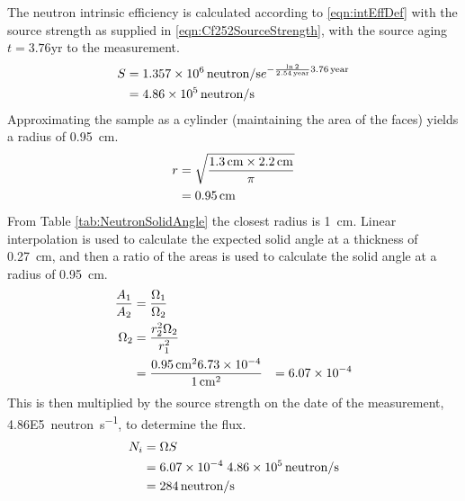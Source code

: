 \documentclass[draftcls,onecolumn]{IEEEtran}
\begin{document}
\begin{Exercise*}[label={PEN LiF with ADS},title={PEN LiF film with ADS},name={Example}]
The neutron intrinsic efficiency is calculated according to \eqref{eqn:intEffDef} with the source strength as supplied in \eqref{eqn:Cf252SourceStrength}, with the source aging $t = 3.76 \text{yr}$ to the measurement.
\begin{align}
    S &= \SI{1.357E6}{neutron\per\second} e^{-\frac{ \ln{2}}{\SI{2.54}{year}}\SI{3.76}{year}} \\ \notag
      &= \SI{4.86E5}{neutron\per\second}
\end{align}
Approximating the sample as a cylinder (maintaining the area of the faces) yields a radius of \SI{0.95}{\cm}.
\begin{align}
	r &= \sqrt{\frac{\SI{1.3}{\cm} \times \SI{2.2}{\cm}}{\pi}} \\ \notag
	& = \SI{0.95}{\cm}
\end{align}
From Table \ref{tab:NeutronSolidAngle} the closest radius is \SI{1}{\cm}.
Linear interpolation is used to calculate the expected solid angle at a thickness of \SI{0.27}{\cm}, and then a ratio of the areas is used to calculate the solid angle at a radius of \SI{0.95}{\cm}.
\begin{align*}
	\frac{A_1}{A_2} &= \frac{\Omega_1}{\Omega_2} \\ \notag
	\Omega_2 &= \frac{r_2^2 \Omega_2}{r_1^2} \\
	 &= \frac{\SI{0.95}{\cm}^2 \num{6.73E-4}}{\SI{1}{\cm}^2}
	 &= \num{6.07E-4}
\end{align*}
This is then multiplied by the source strength on the date of the measurement, \SI{4.86E5}{neutron\per\second}, to determine the flux.
\begin{align*}
 	N_i &= \Omega S \\
	 &= \num{6.07E-4} \; \SI{4.86E5}{neutron\per\second} \\
   &= \SI{284}{neutron\per\second}
\end{align*}


\end{Exercise*}
\end{document}
